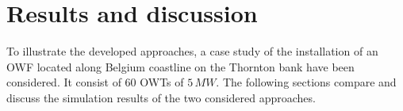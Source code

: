 \section{Results and discussion}
\label{results}
To illustrate the developed approaches, a case study of the installation of an OWF located along Belgium coastline on the Thornton bank have been considered. It consist of $60$ OWTs of $5\, MW$. The following sections compare and discuss the simulation results of the two considered approaches.
